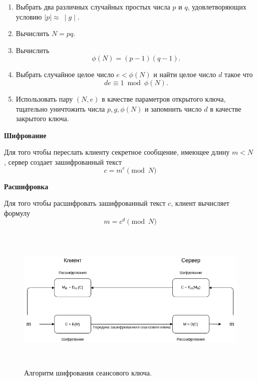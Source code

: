    	\begin{enumerate}
   		\item Выбрать два различных случайных простых числа \(p\) и \(q\), удовлетворяющих условию \(\mid p \mid \approx\ \mid g\mid \).
   		\item Вычислить \(N = pq\).
   		\item Вычислить 
   		\begin{equation}
   			\phi (N) = (p - 1)(q - 1).
   			\label{eq2.1:ref}
   		\end{equation}
   		\item Выбрать случайное целое число \(e < \phi(N)\) и найти целое число \(d\) такое что
   		\begin{equation}
   			de \equiv  1\bmod\phi(N).
   			\label{eq2.2:ref}
   		\end{equation}
   		\item Использовать пару \((N, e)\) в качестве параметров открытого ключа, тщательно уничтожить числа \(p, g, \phi(N)\) и запомнить число \(d\) в качестве закрытого
   		ключа.
   	\end{enumerate}
   	
   	\textbf{Шифрование}
   	
   	Для того чтобы переслать клиенту секретное сообщение, имеющее длину \(m < N\) ,
   	сервер создает зашифрованный текст 
   	\[c = m^e\pmod N\]
   	
   	\textbf{Расшифровка}
   	
   	Для того чтобы расшифровать зашифрованный текст \(c\), клиент вычисляет формулу \[m = c^d\pmod N\]
   	
   	\begin{figure}[h!]
   		\centering
   		\includegraphics[width=\textwidth,height=7cm,keepaspectratio]{rsa.png}
   		\caption{Алгоритм шифрования сеансового ключа.} \label{fig:rsa}
   	\end{figure}
   
